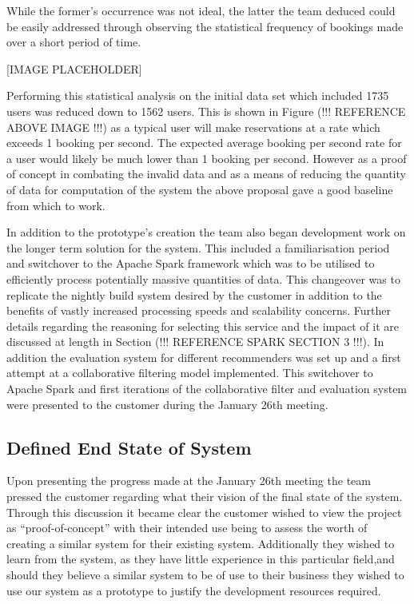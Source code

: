 \documentclass{l3proj}
\begin{document}
While the former’s occurrence was not ideal, the latter the team deduced could be easily addressed through observing the statistical frequency of bookings made over a short period of time.

[IMAGE PLACEHOLDER]

Performing this statistical analysis on the initial data set which included 1735 users was reduced down to 1562 users. This is shown in Figure (!!! REFERENCE ABOVE IMAGE !!!) as a typical user will make reservations at a rate which exceeds 1 booking per second. The expected average booking per second rate for a user would likely be much lower than 1 booking per second. However as a proof of concept in combating the invalid data and as a means of reducing the quantity of data for computation of the system the above proposal gave a good baseline from which to work.

In addition to the prototype’s creation the team also began development work on the longer term solution for the system. This included a familiarisation period and switchover to the Apache Spark framework which was to be utilised to efficiently process potentially massive quantities of data. This changeover was to replicate the nightly build system desired by the customer in addition to the benefits of vastly increased processing speeds and scalability concerns. Further details regarding the reasoning for selecting this service and the impact of it are discussed at length in Section (!!! REFERENCE SPARK SECTION 3 !!!). In addition the evaluation system for different recommenders was set up and a first attempt at a collaborative filtering model implemented. This switchover to Apache Spark and first iterations of the collaborative filter and evaluation system were presented to the customer during the January 26th meeting.


\subsection{Defined End State of System}
\label{jandefinedstate}

Upon presenting the progress made at the January 26th meeting the team pressed the customer regarding what their vision of the final state of the system. Through this discussion it became clear the customer wished to view the project as “proof-of-concept” with their intended use being to assess the worth of creating a similar system for their existing system. Additionally they wished to learn from the system, as they have little experience in this particular field,and should they believe a similar system to be of use to their business they wished to use our system as a prototype to justify the development resources required. 
\end{document}
